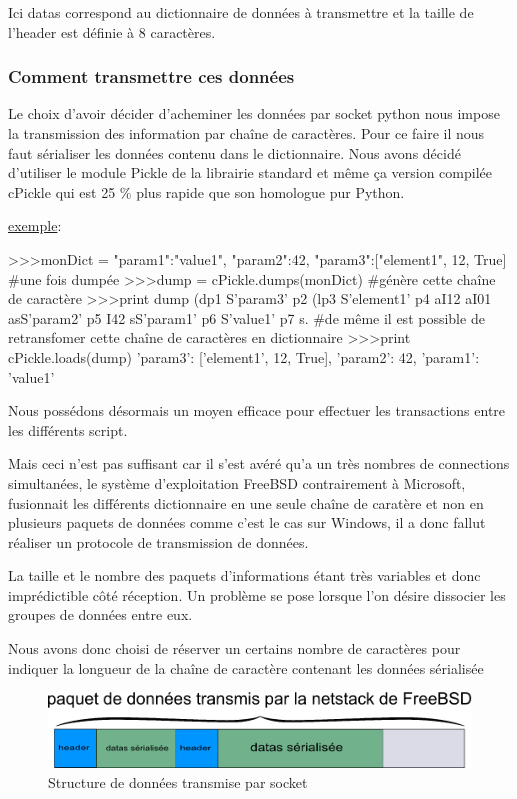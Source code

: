 Ici datas correspond au dictionnaire de données à transmettre et la taille de l'header est définie à 8 caractères.

\newpage

\subsubsection*{Comment transmettre ces données}
Le choix d'avoir décider d'acheminer les données par socket python nous impose la transmission des information par chaîne de caractères. Pour ce faire il nous faut sérialiser les données contenu dans le dictionnaire. Nous avons décidé d'utiliser le module Pickle de la librairie standard et même ça version compilée cPickle qui est 25 \% plus rapide que son homologue pur Python. 

\underline{exemple}:
\begin{python}
>>>monDict = {"param1":"value1", "param2":42, "param3":["element1", 12, True]}
#une fois dumpée
>>>dump = cPickle.dumps(monDict)
#génère cette chaîne de caractère
>>>print dump
(dp1
S'param3'
p2
(lp3
S'element1'
p4
aI12
aI01
asS'param2'
p5
I42
sS'param1'
p6
S'value1'
p7
s.
#de même il est possible de retransfomer cette chaîne de caractères en dictionnaire
>>>print cPickle.loads(dump)
{'param3': ['element1', 12, True], 'param2': 42, 'param1': 'value1'}
\end{python}

Nous possédons désormais un moyen efficace pour effectuer les transactions entre les différents script.

Mais ceci n'est pas suffisant car il s'est avéré qu'a un très nombres de connections simultanées, le système d'exploitation FreeBSD contrairement à Microsoft, fusionnait les différents dictionnaire en une seule chaîne de caratère et non en plusieurs paquets de données comme c'est le cas sur Windows, il a donc fallut réaliser un protocole de transmission de données.

La taille et le nombre des paquets d'informations étant très variables et donc imprédictible côté réception.  Un problème se pose lorsque l'on désire dissocier les groupes de données entre eux.

Nous avons donc choisi de réserver un certains nombre de caractères pour indiquer la longueur de la chaîne de caractère contenant les données sérialisée

\begin{figure}[h!]
	\centering
	\includegraphics[scale=0.55]{images/noaprotocol.png}
	\caption{Structure de données transmise par socket}
\end{figure}


